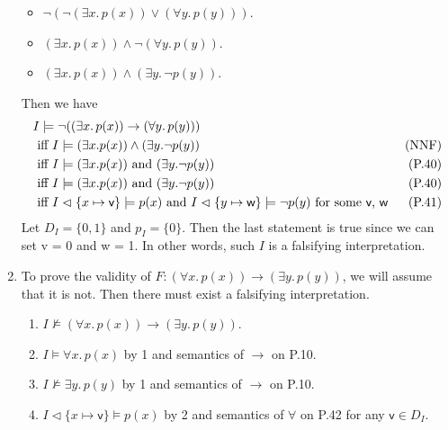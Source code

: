 \begin{exer}[2.2]
\begin{enumerate}[label=(\alph*)]
\begin{itemize}
                \item
                    $\neg(\neg(\exists x.\, p(x)) \lor (\forall y.\, p(y)))$.
                \item
                    $(\exists x.\, p(x)) \land \neg(\forall y.\, p(y))$.
                \item
                    $(\exists x.\, p(x)) \land (\exists y.\, \neg p(y))$.
            \end{itemize}
            Then we have
            \begin{align*}
                &I \models \neg((\exists x.\, p(x)) \rightarrow (\forall y.\, p(y))) \\
                    &\text{ iff } I \models (\exists x. p(x)) \land (\exists y. \neg p(y)) & \text{(NNF)} \\
                    &\text{ iff } I \models (\exists x. p(x)) \text{ and } (\exists y. \neg p(y)) & \text{(P.40)} \\
                    &\text{ iff } I \models (\exists x. p(x)) \text{ and } (\exists y. \neg p(y)) & \text{(P.40)} \\
                    &\text{ iff } I \vartriangleleft \{ x \mapsto \textsf{v} \} \models p(x) \text{ and } I \vartriangleleft \{ y \mapsto \textsf{w} \} \models \neg p(y) \text{ for some \textsf{v}, \textsf{w} } & \text{(P.41)}
            \end{align*}
            Let $D_I = \{ 0, 1 \}$ and $p_I = \{ 0 \}$.
            Then the last statement is true since we can set \textsf{v} = 0 and \textsf{w} = 1.
            In other words, such $I$ is a falsifying interpretation.
        \item %
            To prove the validity of $F: (\forall x.\, p(x)) \rightarrow (\exists y.\, p(y))$, we will assume that it is not.
            Then there must exist a falsifying interpretation.
            \begin{enumerate}[label=\arabic*.]
               \item %
                   $I \not\models (\forall x.\, p(x)) \rightarrow (\exists y.\, p(y))$.
               \item %
                   $I \models \forall x.\, p(x)$ by 1 and semantics of $\rightarrow$ on P.10.
               \item %
                   $I \not\models \exists y.\, p(y)$ by 1 and semantics of $\rightarrow$ on P.10.
               \item %
                   $I \vartriangleleft \{ x \mapsto \textsf{v} \} \models p(x)$ by 2 and semantics of $\forall$ on P.42 for any $\textsf{v} \in D_I$.

\end{enumerate}
\end{enumerate}
\end{exer}
